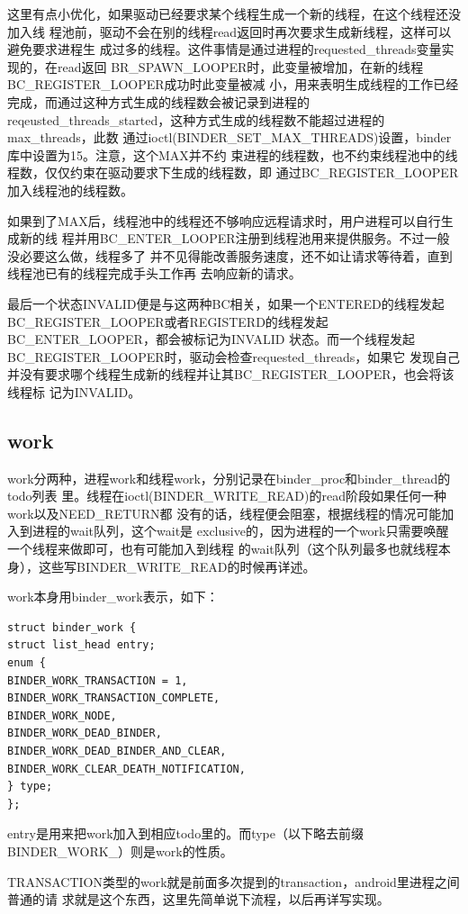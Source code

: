 \documentclass[a4paper,11pt]{article}
\begin{document}
这里有点小优化，如果驱动已经要求某个线程生成一个新的线程，在这个线程还没加入线
程池前，驱动不会在别的线程read返回时再次要求生成新线程，这样可以避免要求进程生
成过多的线程。这件事情是通过进程的requested_threads变量实现的，在read返回
BR_SPAWN_LOOPER时，此变量被增加，在新的线程BC_REGISTER_LOOPER成功时此变量被减
小，用来表明生成线程的工作已经完成，而通过这种方式生成的线程数会被记录到进程的
reqeusted_threads_started，这种方式生成的线程数不能超过进程的max_threads，此数
通过ioctl(BINDER_SET_MAX_THREADS)设置，binder库中设置为15。注意，这个MAX并不约
束进程的线程数，也不约束线程池中的线程数，仅仅约束在驱动要求下生成的线程数，即
通过BC_REGISTER_LOOPER加入线程池的线程数。

如果到了MAX后，线程池中的线程还不够响应远程请求时，用户进程可以自行生成新的线
程并用BC_ENTER_LOOPER注册到线程池用来提供服务。不过一般没必要这么做，线程多了
并不见得能改善服务速度，还不如让请求等待着，直到线程池已有的线程完成手头工作再
去响应新的请求。

最后一个状态INVALID便是与这两种BC相关，如果一个ENTERED的线程发起
BC_REGISTER_LOOPER或者REGISTERD的线程发起BC_ENTER_LOOPER，都会被标记为INVALID
状态。而一个线程发起BC_REGISTER_LOOPER时，驱动会检查requested_threads，如果它
发现自己并没有要求哪个线程生成新的线程并让其BC_REGISTER_LOOPER，也会将该线程标
记为INVALID。


\subsection{ work}
work分两种，进程work和线程work，分别记录在binder_proc和binder_thread的todo列表
里。线程在ioctl(BINDER_WRITE_READ)的read阶段如果任何一种work以及NEED_RETURN都
没有的话，线程便会阻塞，根据线程的情况可能加入到进程的wait队列，这个wait是
exclusive的，因为进程的一个work只需要唤醒一个线程来做即可，也有可能加入到线程
的wait队列（这个队列最多也就线程本身），这些写BINDER_WRITE_READ的时候再详述。

work本身用binder_work表示，如下：
\begin{lstlisting}
struct binder_work {
struct list_head entry;
enum {
BINDER_WORK_TRANSACTION = 1,
BINDER_WORK_TRANSACTION_COMPLETE,
BINDER_WORK_NODE,
BINDER_WORK_DEAD_BINDER,
BINDER_WORK_DEAD_BINDER_AND_CLEAR,
BINDER_WORK_CLEAR_DEATH_NOTIFICATION,
} type;
};
\end{lstlisting}
entry是用来把work加入到相应todo里的。而type（以下略去前缀BINDER_WORK_）则是work的性质。

TRANSACTION类型的work就是前面多次提到的transaction，android里进程之间普通的请
求就是这个东西，这里先简单说下流程，以后再详写实现。
\end{document}
